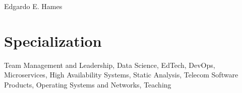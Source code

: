 \documentclass[10pt]{article}
\begin{document}
\color{text1} %




\begin{minipage}[t]{0.48\textwidth} %
\vspace{0pt} %


{\sffamily\Huge Edgardo E. Hames}

\section{Specialization}
Team Management and Leadership, Data Science, EdTech, DevOps, Microservices,
High Availability Systems, Static Analysis, Telecom Software Products, 
Operating Systems and Networks, Teaching\\[10pt]



\end{minipage}
\end{document}
